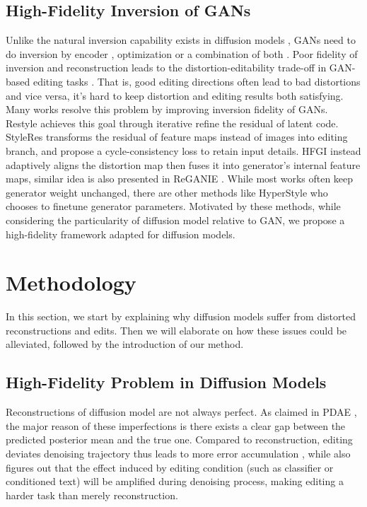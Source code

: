 \documentclass[letterpaper]{article} %
\begin{document}
\subsection{High-Fidelity Inversion of GANs}
Unlike the natural inversion capability exists in diffusion models \cite{song2020denoising}, GANs \cite{goodfellow2020generative} need to do inversion by encoder \cite{richardson2021encoding}, optimization \cite{abdal2020image2stylegan++} or a combination of both \cite{zhu2020domain}. Poor fidelity of inversion and reconstruction leads to the distortion-editability trade-off in GAN-based editing tasks \cite{tov2021designing}. That is, good editing directions often lead to bad distortions and vice versa, it's hard to keep distortion and editing results both satisfying. Many works resolve this problem by improving inversion fidelity of GANs. Restyle \cite{alaluf2021restyle} achieves this goal through iterative refine the residual of latent code. StyleRes \cite{pehlivan2023styleres} transforms the residual of feature maps instead of images into editing branch, and propose a cycle-consistency loss to retain input details. HFGI \cite{wang2022high} instead adaptively aligns the distortion map then fuses it into generator's internal feature maps, similar idea is also presented in ReGANIE \cite{li2023reganie}. While most works often keep generator weight unchanged, there are other methods like HyperStyle \cite{alaluf2022hyperstyle} who chooses to finetune generator parameters. Motivated by these methods, while considering the particularity of diffusion model relative to GAN, we propose a high-fidelity framework adapted for diffusion models. 

\section{Methodology}

In this section, we start by explaining why diffusion models suffer from distorted reconstructions and edits. Then we will elaborate on how these issues could be alleviated, followed by the introduction of our method.

\subsection{High-Fidelity Problem in Diffusion Models}

Reconstructions of diffusion model are not always perfect. As claimed in PDAE \cite{zhang2022unsupervised}, 
the major reason of these imperfections 
is there exists a clear gap between the predicted posterior mean and the true one. Compared to reconstruction, editing deviates denoising trajectory thus leads to more error accumulation \cite{mokady2023null}, while \cite{ho2022classifier} also figures out that the effect induced by editing condition (such as classifier or conditioned text) will be amplified during denoising process, making editing a harder task than merely reconstruction.
\end{document}
